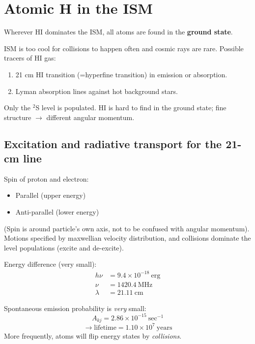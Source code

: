 \documentclass[12pt]{article}
\begin{document}
\section{Atomic H in the ISM}
Wherever HI dominates the ISM, all atoms are found in the \textbf{ground state}.

ISM is too cool for collisions to happen often and cosmic rays are rare.
Possible tracers of HI gas:
\begin{enumerate}
    \item 21 cm HI transition (=hyperfine transition) in emission or absorption.
    \item Lyman absorption lines against hot background stars.
\end{enumerate}
Only the $^{2}$S level is populated. HI is hard to find in the ground state;
fine structure $\rightarrow$ different angular momentum.

\subsection{Excitation and radiative transport for the 21-cm line}
Spin of proton and electron:
\begin{itemize}
    \item Parallel (upper energy)
    \item Anti-parallel (lower energy)
\end{itemize}
(Spin is around particle's own axis, not to be confused with angular
momentum). Motions specified by maxwellian velocity distribution, and
collisions dominate the level populations (excite and de-excite).

Energy difference (very small):
\begin{align*}
    h\nu &= 9.4\times10^{-18}\:\mathrm{erg}\\
    \nu &= 1420.4\:\mathrm{MHz}\\
    \lambda &= 21.11\:\mathrm{cm}
\end{align*}

Spontaneous emission probability is \emph{very} small:
$${ A_{kj} = 2.86\times10^{-15}\:\mathrm{sec}^{-1}  }$$
$${ \rightarrow \mathrm{lifetime} = 1.10\times10^{7}\:\mathrm{years} }$$
More frequently, atoms will flip energy states by \emph{collisions}.
\end{document}

